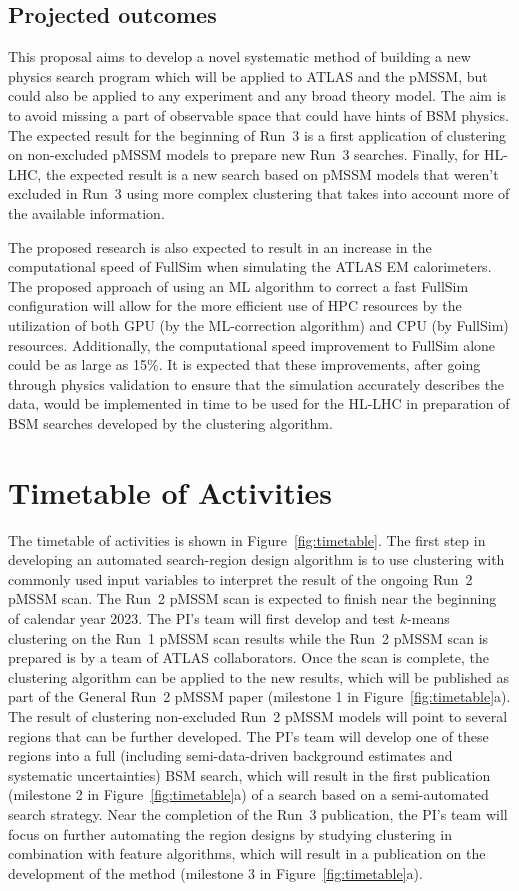 \documentclass[letter, USenglish, 11pt, subfigure]{article}
\begin{document}
\subsection{Projected outcomes} 

This proposal aims to develop a novel systematic method of building a new physics search program which will be applied to ATLAS and the pMSSM, but could also be applied to any experiment and any broad theory model. The aim is to avoid missing a part of observable space that could have hints of BSM physics. The expected result for the beginning of Run~3 is a first application of clustering on non-excluded pMSSM models to prepare new Run~3 searches. Finally, for HL-LHC, the expected result is a new search based on pMSSM models that weren't excluded in Run~3 using more complex clustering that takes into account more of the available information. 

The proposed research is also expected to result in an increase in the computational speed of FullSim when simulating the ATLAS EM calorimeters. The proposed approach of using an ML algorithm to correct a fast FullSim configuration will allow for the more efficient use of HPC resources by the utilization of both GPU (by the ML-correction algorithm) and CPU (by FullSim) resources. Additionally, the computational speed improvement to FullSim alone could be as large as 15\%. It is expected that these improvements, after going through physics validation to ensure that the simulation accurately describes the data, would be implemented in time to be used for the HL-LHC in preparation of BSM searches developed by the clustering algorithm.

\section{Timetable of Activities}

The timetable of activities is shown in Figure~\ref{fig:timetable}. The first step in developing an automated search-region design algorithm is to use clustering with commonly used input variables to interpret the result of the ongoing Run~2 pMSSM scan. The Run~2 pMSSM scan is expected to finish near the beginning of calendar year 2023. The PI's team will first develop and test $k$-means clustering on the Run~1 pMSSM scan results while the Run~2 pMSSM scan is prepared is by a team of ATLAS collaborators. Once the scan is complete, the clustering algorithm can be applied to the new results, which will be published as part of the General Run~2 pMSSM paper (milestone 1 in Figure~\ref{fig:timetable}a). The result of clustering non-excluded Run~2 pMSSM models will point to several regions that can be further developed. The PI's team will develop one of these regions into a full (including semi-data-driven background estimates and systematic uncertainties) BSM search, which will result in the first publication (milestone 2 in Figure~\ref{fig:timetable}a) of a search based on a semi-automated search strategy. Near the completion of the Run~3 publication, the PI's team will focus on further automating the region designs by studying clustering in combination with feature algorithms, which will result in a publication on the development of the method (milestone 3 in Figure~\ref{fig:timetable}a).
\end{document}
